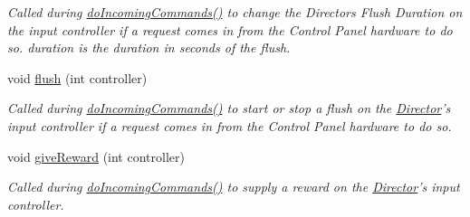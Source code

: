 \begin{DoxyCompactItemize}
\begin{DoxyCompactList}\small\item\em Called during \hyperlink{class_control_panel_interface_a405de6656ffb2e4ac404595e783125fb}{do\-Incoming\-Commands()} to change the Directors Flush Duration on the input controller if a request comes in from the Control Panel hardware to do so. duration is the duration in seconds of the flush. \end{DoxyCompactList}\item 
void \hyperlink{class_control_panel_interface_adee3ebce078cc0c17d4ab36092e8b2e6}{flush} (int controller)
\begin{DoxyCompactList}\small\item\em Called during \hyperlink{class_control_panel_interface_a405de6656ffb2e4ac404595e783125fb}{do\-Incoming\-Commands()} to start or stop a flush on the \hyperlink{class_director}{Director}'s input controller if a request comes in from the Control Panel hardware to do so. \end{DoxyCompactList}\item 
void \hyperlink{class_control_panel_interface_a0d304a64b1922ad1439ad9e97bc2e455}{give\-Reward} (int controller)
\begin{DoxyCompactList}\small\item\em Called during \hyperlink{class_control_panel_interface_a405de6656ffb2e4ac404595e783125fb}{do\-Incoming\-Commands()} to supply a reward on the \hyperlink{class_director}{Director}'s input controller. \end{DoxyCompactList}\end{DoxyCompactItemize}
